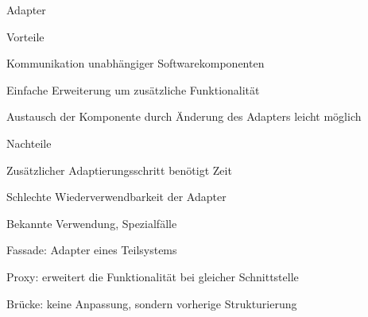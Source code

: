\documentclass[a4paper]{article}
\begin{document}
\begin{multicols}{3}
  Adapter
  \begin{itemize*}
    \item Vorteile
          \begin{itemize*}
            \item Kommunikation unabhängiger Softwarekomponenten
            \item Einfache Erweiterung um zusätzliche Funktionalität
            \item Austausch der Komponente durch Änderung des Adapters leicht möglich
          \end{itemize*}
    \item Nachteile
          \begin{itemize*}
            \item Zusätzlicher Adaptierungsschritt benötigt Zeit
            \item Schlechte Wiederverwendbarkeit der Adapter
          \end{itemize*}
    \item Bekannte Verwendung, Spezialfälle
          \begin{itemize*}
            \item Fassade: Adapter eines Teilsystems
            \item Proxy: erweitert die Funktionalität bei gleicher Schnittstelle
            \item Brücke: keine Anpassung, sondern vorherige Strukturierung
          \end{itemize*}
  \end{itemize*}


\end{multicols}
\end{document}
